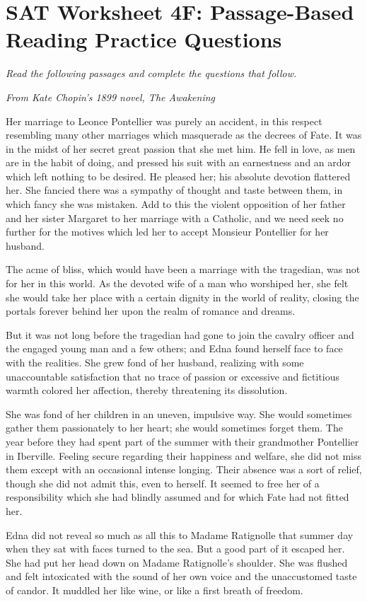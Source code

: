 \newpage
\section[Passage-Based Reading]{SAT Worksheet 4F: Passage-Based Reading Practice Questions}
\textit{Read the following passages and complete the questions that follow.}

\bigskip
\textit{From Kate Chopin's 1899 novel, The Awakening}

\bigskip
\begin{linenumbers*}
\modulolinenumbers[5]
\indent Her marriage to Leonce Pontellier was purely an accident, in this respect resembling many other marriages which masquerade as the decrees of Fate. It was in the midst of her secret great passion that she met him. He fell in love, as men are in the habit of doing, and pressed his suit with an earnestness and an ardor which left nothing to be desired. He pleased her; his absolute devotion flattered her. She fancied there was a sympathy of thought and taste between them, in which fancy she was mistaken. Add to this the violent opposition of her father and her sister Margaret to her marriage with a Catholic, and we need seek no further for the motives which led her to accept Monsieur Pontellier for her husband.

\indent The acme of bliss, which would have been a marriage with the tragedian, was not for her in this world. As the devoted wife of a man who worshiped her, she felt she would take her place with a certain dignity in the world of reality, closing the portals forever behind her upon the realm of romance and dreams.

\indent But it was not long before the tragedian had gone to join the cavalry officer and the engaged young man and a few others; and Edna found herself face to face with the realities. She grew fond of her husband, realizing with some unaccountable satisfaction that no trace of passion or excessive and fictitious warmth colored her affection, thereby threatening its dissolution.

\indent She was fond of her children in an uneven, impulsive way. She would sometimes gather them passionately to her heart; she would sometimes forget them. The year before they had spent part of the summer with their grandmother Pontellier in Iberville. Feeling secure regarding their happiness and welfare, she did not miss them except with an occasional intense longing. Their absence was a sort of relief, though she did not admit this, even to herself. It seemed to free her of a responsibility which she had blindly assumed and for which Fate had not fitted her.

\indent Edna did not reveal so much as all this to Madame Ratignolle that summer day when they sat with faces turned to the sea. But a good part of it escaped her. She had put her head down on Madame Ratignolle's shoulder. She was flushed and felt intoxicated with the sound of her own voice and the unaccustomed taste of candor. It muddled her like wine, or like a first breath of freedom.
\end{linenumbers*}

